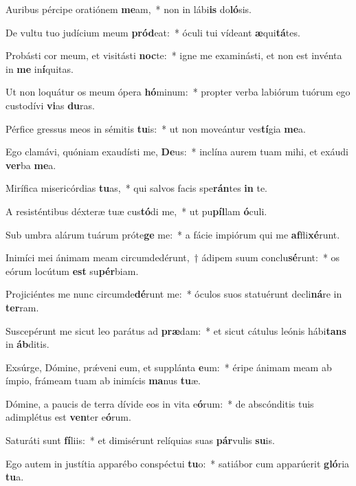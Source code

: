 \item Auribus pércipe oratiónem \textbf{me}am,~* non in lábi\textbf{is} do\textbf{ló}sis.
\item De vultu tuo judícium meum \textbf{pród}eat:~* óculi tui vídeant \textbf{æ}qui\textbf{tá}tes.
\item Probásti cor meum, et visitásti \textbf{noc}te:~* igne me examinásti, et non est invénta in \textbf{me} in\textbf{í}quitas.
\item Ut non loquátur os meum ópera \textbf{hó}minum:~* propter verba labiórum tuórum ego custodívi \textbf{vi}as \textbf{du}ras.
\item Pérfice gressus meos in sémitis \textbf{tu}is:~* ut non moveántur ves\textbf{tí}gia \textbf{me}a.
\item Ego clamávi, quóniam exaudísti me, \textbf{De}us:~* inclína aurem tuam mihi, et exáudi \textbf{ver}ba \textbf{me}a.
\item Mirífica misericórdias \textbf{tu}as,~* qui salvos facis spe\textbf{rán}tes \textbf{in} te.
\item A resisténtibus déxteræ tuæ cus\textbf{tó}di me,~* ut pu\textbf{píl}lam \textbf{ó}culi.
\item Sub umbra alárum tuárum próte\textbf{ge} me:~* a fácie impiórum qui me \textbf{af}fli\textbf{xé}runt.
\item Inimíci mei ánimam meam circumdedérunt,~† ádipem suum conclu\textbf{sé}runt:~* os eórum locútum \textbf{est} su\textbf{pér}biam.
\item Projiciéntes me nunc circumde\textbf{dé}runt me:~* óculos suos statuérunt decli\textbf{ná}re in \textbf{ter}ram.
\item Suscepérunt me sicut leo parátus ad \textbf{præ}dam:~* et sicut cátulus leónis hábi\textbf{tans} in \textbf{áb}ditis.
\item Exsúrge, Dómine, prǽveni eum, et supplánta \textbf{e}um:~* éripe ánimam meam ab ímpio, frámeam tuam ab inimícis \textbf{ma}nus \textbf{tu}æ.
\item Dómine, a paucis de terra dívide eos in vita e\textbf{ó}rum:~* de abscónditis tuis adimplétus est \textbf{ven}ter e\textbf{ó}rum.
\item Saturáti sunt \textbf{fí}liis:~* et dimisérunt relíquias suas \textbf{pár}vulis \textbf{su}is.
\item Ego autem in justítia apparébo conspéctui \textbf{tu}o:~* satiábor cum apparúerit \textbf{gló}ria \textbf{tu}a.
